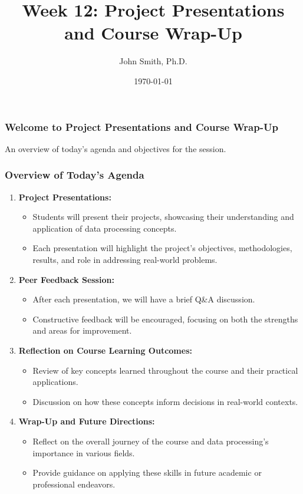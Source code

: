 \documentclass[aspectratio=169]{beamer}
\title[Project Presentations]{Week 12: Project Presentations and Course Wrap-Up}
\author[J. Smith]{John Smith, Ph.D.}
\institute[University Name]{
  Department of Computer Science\\
  University Name\\
  \vspace{0.3cm}
  Email: email@university.edu\\
  Website: www.university.edu
}
\date{\today}
\begin{document}
\frame{\titlepage}

\begin{frame}[fragile]
    \frametitle{Welcome to Project Presentations and Course Wrap-Up}
    An overview of today's agenda and objectives for the session.
\end{frame}

\begin{frame}[fragile]
    \frametitle{Overview of Today’s Agenda}
    \begin{enumerate}
        \item \textbf{Project Presentations:}
        \begin{itemize}
            \item Students will present their projects, showcasing their understanding and application of data processing concepts.
            \item Each presentation will highlight the project's objectives, methodologies, results, and role in addressing real-world problems.
        \end{itemize}
        
        \item \textbf{Peer Feedback Session:}
        \begin{itemize}
            \item After each presentation, we will have a brief Q\&A discussion.
            \item Constructive feedback will be encouraged, focusing on both the strengths and areas for improvement.
        \end{itemize}
        
        \item \textbf{Reflection on Course Learning Outcomes:}
        \begin{itemize}
            \item Review of key concepts learned throughout the course and their practical applications.
            \item Discussion on how these concepts inform decisions in real-world contexts.
        \end{itemize}

        \item \textbf{Wrap-Up and Future Directions:}
        \begin{itemize}
            \item Reflect on the overall journey of the course and data processing's importance in various fields.
            \item Provide guidance on applying these skills in future academic or professional endeavors.
        \end{itemize}
    \end{enumerate}
\end{frame}
\end{document}
